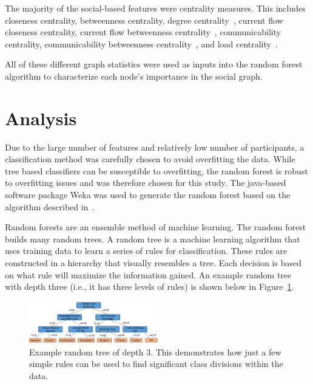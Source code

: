 \documentclass{article}
\begin{document}
The majority of the social-based features were centrality measures.  This includes closeness centrality, betweenness centrality, degree centrality~\cite{borgatti2011analyzing}, current flow closeness centrality, current flow betweenness centrality~\cite{brandes2005centrality}, communicability centrality, communicability betweenness centrality~\cite{estrada2008communicability}, and load centrality~\cite{newman2001scientific}.

All of these different graph statistics were used as inputs into the random forest algorithm to characterize each node's importance in the social graph.


\section{Analysis} \label{Analysis}

Due to the large number of features and relatively low number of participants, a classification method was carefully chosen to avoid overfitting the data.  While tree based classifiers can be susceptible to overfitting, the random forest is robust to overfitting issues and was therefore chosen for this study.  The java-based software package Weka was used to generate the random forest based on the algorithm described in~\cite{Breiman2001}.

Random forests are an ensemble method of machine learning.  The random forest builds many random trees.  A random tree is a machine learning algorithm that uses training data to learn a series of rules for classification.  These rules are constructed in a hierarchy that visually resembles a tree.  Each decision is based on what rule will maximize the information gained.  An example random tree with depth three (i.e., it has three levels of rules) is shown below in Figure~\ref{fig:ex_tree}.
\begin{figure}[H]
    \centering
        \includegraphics[width=0.5\textwidth]{3_level_tree}
        \caption{Example random tree of depth 3.  This demonstrates how just a few simple rules can be used to find significant class divisions within the data.}
        \label{fig:ex_tree}
\end{figure}
\end{document}
